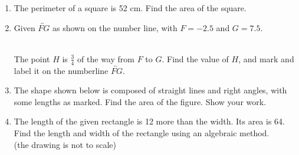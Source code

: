 \documentclass[12pt, twoside]{article}
\begin{document}
\begin{enumerate}
\item The perimeter of a square is 52 cm. Find the area of the square.

\newpage
\item Given $\overleftrightarrow{FG}$ as shown on the number line, with $F=-2.5$ and $G=7.5$. \\[20pt] %
  \\[5pt]
  The point $H$ is $\frac{3}{4}$ of the way from $F$ to $G$. Find the value of $H$, and mark and label it on the numberline $\overleftrightarrow{FG}$. 
  \vspace{6cm}

\item The shape shown below is composed of straight lines and right angles, with some lengths as marked. Find the area of the figure. Show your work.
  \begin{flushleft}
  \end{flushleft} \vspace{2cm}

\newpage

\item The length of the given rectangle is 12 more than the width. Its area is 64. Find the length and width of the rectangle using an algebraic method.\\[5pt]
  (the drawing is not to scale)
  \begin{flushleft}
  \end{flushleft} \vspace{5cm}


\end{enumerate}
\end{document}

